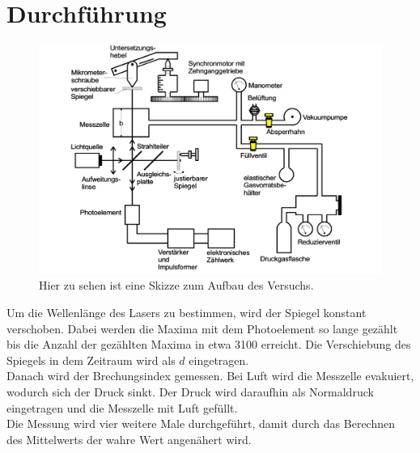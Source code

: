 \section{Durchführung}
\label{sec:Durchfuehrung}

\begin{figure}
    \centering
    \includegraphics[scale = 0.3]{content/Aufbau1.pdf}
    \caption{Hier zu sehen ist eine Skizze zum Aufbau des Versuchs.}
    \label{fig:Teiler}
\end{figure}

Um die Wellenlänge des Lasers zu bestimmen, wird der Spiegel konstant verschoben. Dabei werden die Maxima mit dem Photoelement so lange gezählt bis die Anzahl der gezählten Maxima in etwa 3100 erreicht. Die Verschiebung des Spiegels in dem Zeitraum wird als \(d\) eingetragen.\\
Danach wird der Brechungsindex gemessen. Bei Luft wird die Messzelle evakuiert, wodurch sich der Druck sinkt. Der Druck wird daraufhin als Normaldruck eingetragen und die Messzelle mit Luft gefüllt.\\
Die Messung wird vier weitere Male durchgeführt, damit durch das Berechnen des Mittelwerts der wahre Wert angenähert wird.